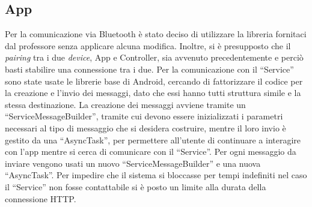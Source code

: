 \documentclass[a4paper, 12pt]{report}
\begin{document}
			\subsection{App}
			Per la comunicazione via Bluetooth è stato deciso di utilizzare la libreria fornitaci dal
			professore senza applicare alcuna modifica. Inoltre, si è presupposto che il \textit{pairing}
			tra i due \textit{device}, App e Controller, sia avvenuto precedentemente e perciò basti
			stabilire una connessione tra i due.\newline
			Per la comunicazione con il ``Service'' sono state usate le librerie base di Android, cercando 
			di fattorizzare il codice per la creazione e l'invio dei messaggi, dato che essi hanno tutti 
			struttura simile e la stessa destinazione. La creazione dei messaggi avviene tramite un ``ServiceMessageBuilder'', 
			tramite cui devono essere inizializzati i parametri necessari al tipo di messaggio che si desidera
			costruire, mentre il loro invio è gestito da una ``AsyncTask'', per permettere all'utente di continuare 
			a interagire con l'app mentre si cerca di comunicare con il ``Service''. Per ogni messaggio da inviare 
			vengono usati un nuovo ``ServiceMessageBuilder'' e una nuova ``AsyncTask''.\newline
			Per impedire che il sistema si bloccasse per tempi indefiniti nel caso il ``Service'' non fosse 
			contattabile si è posto un limite alla durata della connessione HTTP.
\end{document}
